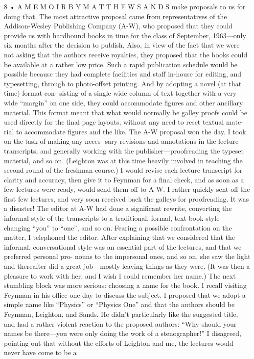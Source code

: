 \documentclass[11pt,oneside]{article}
\begin{document}
8 • A  M E M O I R  B Y  M A T T H E W  S A N D S make proposals to us for doing that. The most attractive proposal came from representatives of the Addison-Wesley Publishing Company (A-W), who proposed that they could provide us with hardbound books in time for the class of September, 1963---only six months after the decision to publish. Also, in view of the fact that we were not asking that the authors receive royalties, they proposed that the books could be available at a rather low price. Such a rapid publication schedule would be possible because they had complete facilities and staff in-house for editing, and typesetting, through to photo-offset printing. And by adopting a novel (at that time) format con- sisting of a single wide column of text together with a very wide “margin” on one side, they could accommodate figures and other ancillary material. This format meant that what would normally be galley proofs could be used directly for the final page layouts, without any need to reset textual mate- rial to accommodate figures and the like. The A-W proposal won the day. I took on the task of making any neces- sary revisions and annotations in the lecture transcripts, and generally working with the publisher---proofreading the typeset material, and so on. (Leighton was at this time heavily involved in teaching the second round of the freshman course.) I would revise each lecture transcript for clarity and accuracy, then give it to Feynman for a final check, and as soon as a few lectures were ready, would send them off to A-W. I rather quickly sent off the first few lectures, and very soon received back the galleys for proofreading. It was a disaster! The editor at A-W had done a significant rewrite, converting the informal style of the transcripts to a traditional, formal, text-book style---changing “you” to “one”, and so on. Fearing a possible confrontation on the matter, I telephoned the editor. After explaining that we considered that the informal, conversational style was an essential part of the lectures, and that we preferred personal pro- nouns to the impersonal ones, and so on, she saw the light and thereafter did a great job---mostly leaving things as they were. (It was then a pleasure to work with her, and I wish I could remember her name.) The next stumbling block was more serious: choosing a name for the book. I recall visiting Feynman in his office one day to discuss the subject. I proposed that we adopt a simple name like “Physics” or “Physics One” and that the authors should be Feynman, Leighton, and Sands. He didn’t particularly like the suggested title, and had a rather violent reaction to the proposed authors: “Why should your names be there---you were only doing the work of a stenographer!” I disagreed, pointing out that without the efforts of Leighton and me, the lectures would never have come to be a\par
\end{document}
